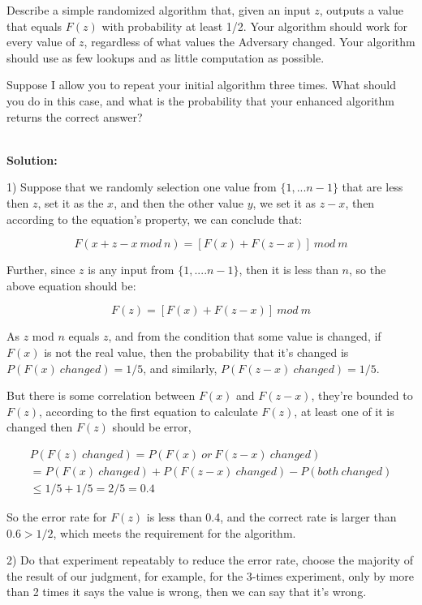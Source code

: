 \documentclass{article}
\begin{document}
Describe a simple randomized algorithm that, given an input $z$, outputs a value that equals $F(z)$ with
probability at least 1/2. Your algorithm should work for every value of $z$, regardless of what values the
Adversary changed. Your algorithm should use as few lookups and as little computation as possible.


Suppose I allow you to repeat your initial algorithm three times. What should you do in this case, and
what is the probability that your enhanced algorithm returns the correct answer?

~\\

\noindent \textbf{Solution:}

1) Suppose that we randomly selection one value from $\{1, ... n-1\}$ that are less then $z$, set it as the $x$, and then the other value $y$, we set it as $z-x$, then according to the equation's property, we can conclude that:

$$F(x + z-x \ mod \ n) = [F(x) + F(z-x)] \ mod \ m$$

Further, since $z$ is any input from $\{1, .... n-1 \}$, then it is less than $n$, so the above equation should be:

$$F(z) = [F(x) + F(z-x)] \ mod \ m$$

As $z$ mod $n$ equals $z$, and from the condition that some value is changed, if $F(x)$ is not the real value, then the probability that it's changed is $P(F(x) \ changed) = 1/5$, and similarly, $P(F(z-x) \ changed) = 1/5$.

But there is some correlation between $F(x)$ and $F(z-x)$, they're bounded to $F(z)$, according to the first equation to calculate $F(z)$, at least one of it is changed then $F(z)$ should be error,


\begin{equation}
\begin{aligned}
P(F(z) \ changed)
= P(F(x) \ or \ F(z-x) \ changed) \\
= P(F(x) \ changed)
+ P(F(z-x) \ changed)
- P(both \ changed) \\
\le 1/5 + 1/5 = 2/5 = 0.4
\end{aligned}
\end{equation}


So the error rate for $F(z)$ is less than 0.4, and the correct rate is larger than $0.6 > 1/2$, which meets the requirement for the algorithm.

2) Do that experiment repeatably to reduce the error rate, choose the majority of the result of our judgment, for example, for the 3-times experiment, only by more than 2 times it says the value is wrong, then we can say that it's wrong.
\end{document}
